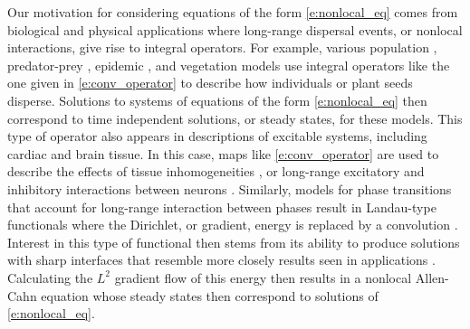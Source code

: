 \documentclass[11pt]{amsart}   	%
\theoremstyle{plain}
\numberwithin{equation}{section}
\begin{document}
Our motivation for considering equations of the form \eqref{e:nonlocal_eq} comes from biological and physical applications where long-range dispersal events, or nonlocal interactions, give rise to integral operators. For example, various population \cite{cosner2012, hutson2003, lutscher2005}, predator-prey \cite{hao2021, sherratt2016,wu2023}, epidemic \cite{ying2013, yang2015, zhao2018}, and vegetation models \cite{baudena2013, eigentler2018, thompson2009} use integral operators like the one given in \eqref{e:conv_operator} to describe how individuals or plant seeds disperse. Solutions to systems of equations of the form \eqref{e:nonlocal_eq} then correspond to time independent solutions, or steady states, for these models. This type of operator also appears in descriptions of excitable systems, including cardiac and brain tissue. In this case, maps like \eqref{e:conv_operator} are used to describe the effects of tissue inhomogeneities \cite{bueno-orovio2014}, or long-range excitatory and inhibitory interactions between neurons \cite{faye2015, ermentrout2001}. Similarly, models for phase transitions that account for long-range interaction between phases result in Landau-type functionals where the Dirichlet, or gradient, energy is replaced by a convolution \cite{bates2006, du2024}.  Interest in this type of functional then stems from its ability to produce  solutions with sharp interfaces that resemble more closely results seen in applications \cite{burkovska2023, olena2021}. Calculating the $L^2$ gradient flow of this energy then results in a nonlocal Allen-Cahn equation whose steady states then correspond to solutions of \eqref{e:nonlocal_eq}. 

\end{document}
